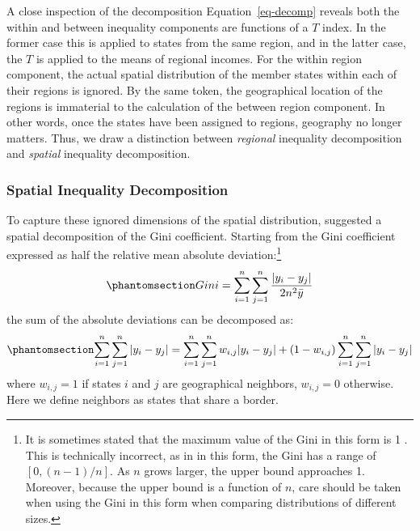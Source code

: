 \documentclass[
  a4paper, 
  twoside,
  final
]{article}
\begin{document}
A close inspection of the decomposition Equation~\ref{eq-decomp} reveals
both the within and between inequality components are functions of a
\(T\) index. In the former case this is applied to states from the same
region, and in the latter case, the \(T\) is applied to the means of
regional incomes. For the within region component, the actual spatial
distribution of the member states within each of their regions is
ignored. By the same token, the geographical location of the regions is
immaterial to the calculation of the between region component. In other
words, once the states have been assigned to regions, geography no
longer matters. Thus, we draw a distinction between \emph{regional}
inequality decomposition and \emph{spatial} inequality decomposition.

\subsubsection{Spatial Inequality
Decomposition}\label{spatial-inequality-decomposition}

To capture these ignored dimensions of the spatial distribution,
\citet{rey2013SpatialDecomposition} suggested a spatial decomposition of
the Gini coefficient. Starting from the Gini coefficient expressed as
half the relative mean absolute deviation:\footnote{It is sometimes
  stated that the maximum value of the Gini in this form is 1
  \citep[e.g.,][]{wang2024RobustMethod}. This is technically incorrect,
  as in in this form, the Gini has a range of \([0, (n-1)/n]\). As \(n\)
  grows larger, the upper bound approaches 1. Moreover, because the
  upper bound is a function of \(n\), care should be taken when using
  the Gini in this form when comparing distributions of different sizes.}
\begin{equation}\phantomsection\label{eq-gini-mad}{
Gini = \sum_{i=1}^n \sum_{j=1}^n \frac{|y_i - y_j|}{2n^2 \bar{y}}
}\end{equation} the sum of the absolute deviations can be decomposed as:
\begin{equation}\phantomsection\label{eq-gini-sad}{
\sum_{i=1}^n \sum_{j=1}^n |y_i - y_j| = \sum_{i=1}^n \sum_{j=1}^n w_{i,j} |y_i -
y_j| + (1-w_{i,j})\sum_{i=1}^n \sum_{j=1}^n |y_i - y_j|
}\end{equation} where \(w_{i,j} = 1\) if states \(i\) and \(j\) are
geographical neighbors, \(w_{i,j}=0\) otherwise. Here we define
neighbors as states that share a border.
\end{document}
